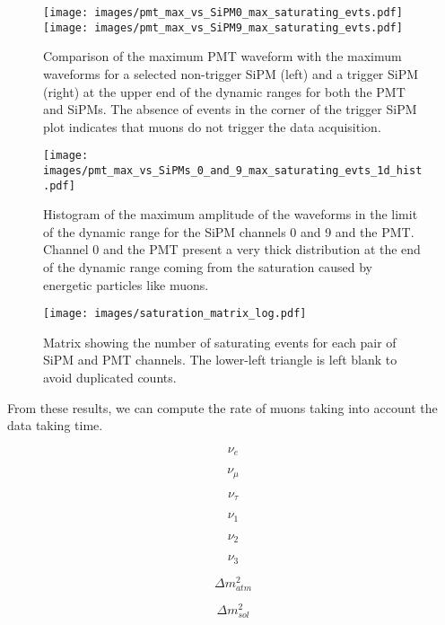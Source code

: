 \documentclass[11pt,a4paper,english,oneside, pdf]{article}
\begin{document}
	\begin{figure}[!h]
		\begin{center}
			\texttt{[image: images/pmt\_max\_vs\_SiPM0\_max\_saturating\_evts.pdf]}
			\texttt{[image: images/pmt\_max\_vs\_SiPM9\_max\_saturating\_evts.pdf]}
			\caption{Comparison of the maximum PMT waveform with the maximum waveforms for a selected non-trigger SiPM (left) and a trigger SiPM (right) at the upper end of the dynamic ranges for both the PMT and SiPMs. The absence of events in the corner of the trigger SiPM plot indicates that muons do not trigger the data acquisition.}
			\label{fig:saturating_evts}
		\end{center}
	\end{figure}
	
	
	\begin{figure}[!h]
		\begin{center}
			\texttt{[image: images/pmt\_max\_vs\_SiPMs\_0\_and\_9\_max\_saturating\_evts\_1d\_hist.pdf]}
			\caption{Histogram of the maximum amplitude of the waveforms in the limit of the dynamic range for the SiPM channels 0 and 9 and the PMT. Channel 0 and the PMT present a very thick distribution at the end of the dynamic range coming from the saturation caused by energetic particles like muons.}
			\label{fig:saturating_evts2}
		\end{center}
	\end{figure}
	
	\begin{figure}[!h]
		\begin{center}
			\texttt{[image: images/saturation\_matrix\_log.pdf]}
			\caption{Matrix showing the number of saturating events for each pair of SiPM and PMT channels. The lower-left triangle is left blank to avoid duplicated counts.}
			\label{fig:saturating_matrix}
		\end{center}
	\end{figure}
	
	From these results, we can compute the rate of muons taking into account the data taking time.
	
	
	\begin{equation}
		\nu_e
	\end{equation}
	
	\begin{equation}
		\nu_{\mu}
	\end{equation}
	
	\begin{equation}
		\nu_{\tau}
	\end{equation}
	
	\begin{equation}
		\nu_1
	\end{equation}
	
	\begin{equation}
		\nu_2
	\end{equation}
	
	\begin{equation}
		\nu_3
	\end{equation}
	
	\begin{equation}
		\Delta m ^2_{atm}
	\end{equation}
	
	\begin{equation}
		\Delta m ^2_{sol}
	\end{equation}
\end{document}
